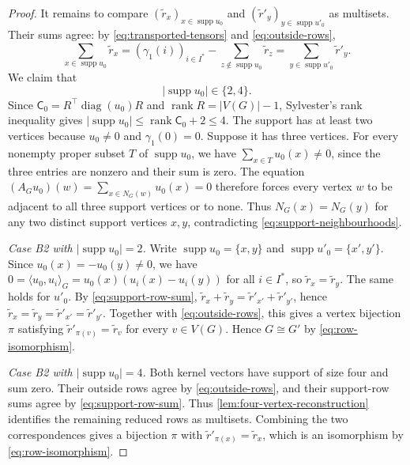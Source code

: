 \documentclass[10pt,a4paper]{article}
\theoremstyle{plain}
\theoremstyle{definition}
\DeclareMathOperator{\supp}{supp}
\DeclareMathOperator{\rank}{rank}
\DeclareMathOperator{\diag}{diag}
\begin{document}
\begin{proof}
  It remains to compare $(\tilde{r}_x)_{x\in\supp u_0}$ and
  $(\tilde{r}'_y)_{y\in\supp u'_0}$ as multisets.
  Their sums agree: by
  \cref{eq:transported-tensors} and \cref{eq:outside-rows},
  \begin{equation}\label{eq:support-row-sum}
    \sum_{x\in\supp u_0}\tilde{r}_x
    = (\gamma_1(i))_{i\in I^*}-\sum_{z\notin\supp u_0}\tilde{r}_z
    = \sum_{y\in\supp u'_0}\tilde{r}'_y.
  \end{equation}
  We claim that
  \begin{equation}\label{eq:kernel-support-sizes}
    |\supp u_0|\in\{2,4\}.
  \end{equation}
  Since $\mathsf{C}_0 = R^{\top} \diag(u_0) R$ and
  $\rank R=|V(G)|-1$, Sylvester's rank inequality gives
  $|\supp u_0| \leq \rank \mathsf{C}_0 + 2 \leq 4$.
  The support has at least two vertices because $u_0\ne0$ and
  $\gamma_1(0)=0$.
  Suppose it has three vertices. For every nonempty proper subset
  $T$ of $\supp u_0$, we have $\sum_{x\in T}u_0(x)\ne0$, since
  the three entries are nonzero and their sum is zero.
  The equation $(A_Gu_0)(w)=\sum_{x\in N_G(w)}u_0(x)=0$ therefore
  forces every vertex $w$ to be adjacent to all three support
  vertices or to none. Thus $N_G(x)=N_G(y)$ for any two distinct
  support vertices $x,y$, contradicting \cref{eq:support-neighbourhoods}.

  \emph{Case B2 with $|\supp u_0|=2$.} Write
  $\supp u_0=\{x,y\}$ and $\supp u'_0=\{x',y'\}$.
  Since $u_0(x)=-u_0(y)\ne0$, we have
  $0=\langle u_0,u_i\rangle_G=u_0(x)(u_i(x)-u_i(y))$ for all $i\in I^*$,
  so $\tilde{r}_x=\tilde{r}_y$. The same holds for $u'_0$.
  By \cref{eq:support-row-sum},
  $\tilde{r}_x+\tilde{r}_y=\tilde{r}'_{x'}+\tilde{r}'_{y'}$, hence
  $\tilde{r}_x=\tilde{r}_y=\tilde{r}'_{x'}=\tilde{r}'_{y'}$.
  Together with \cref{eq:outside-rows}, this gives a vertex bijection
  $\pi$ satisfying $\tilde{r}'_{\pi(v)}=\tilde{r}_v$ for every $v\in V(G)$.
  Hence $G\cong G'$ by \cref{eq:row-isomorphism}.

  \emph{Case B2 with $|\supp u_0|=4$.}
  Both kernel vectors have support of size four and sum zero.
  Their outside rows agree by \cref{eq:outside-rows}, and their
  support-row sums agree by \cref{eq:support-row-sum}.
  Thus \cref{lem:four-vertex-reconstruction} identifies the remaining
  reduced rows as multisets.
  Combining the two correspondences gives a bijection $\pi$ with
  $\tilde{r}'_{\pi(x)}=\tilde{r}_x$, which is an isomorphism by \cref{eq:row-isomorphism}.
\end{proof}
\end{document}

